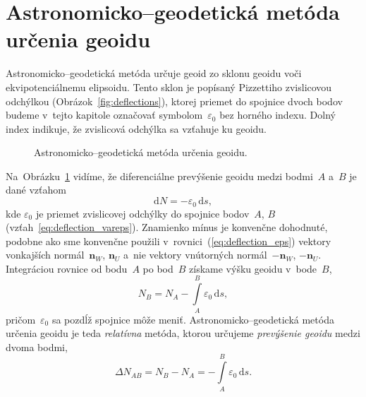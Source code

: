 \documentclass[a4paper, 12pt]{book}
\newcommand{\diff}{\mathrm d}
\let\vec\mathbf
\begin{document}
\section{Astronomicko--geodetická metóda určenia geoidu}
\label{sec:geoid_astrogeodetic}

Astronomicko--geodetická metóda určuje geoid zo sklonu geoidu voči 
ekvipotenciálnemu elipsoidu.  Tento sklon je popísaný Pizzettiho zvislicovou 
odchýlkou (Obrázok~\ref{fig:deflections}), ktorej priemet do spojnice dvoch 
bodov budeme v~tejto kapitole označovať symbolom~$\varepsilon_0$ bez horného 
indexu.  Dolný index indikuje, že zvislicová odchýlka sa vzťahuje ku geoidu.

\begin{figure}[bt]
\centering

\caption{Astronomicko--geodetická metóda určenia geoidu.}
\label{fig:astrogeodetic_method}
\end{figure}

Na~Obrázku~\ref{fig:astrogeodetic_method} vidíme, že diferenciálne prevýšenie 
geoidu medzi bodmi~$A$ a~$B$ je dané vzťahom \parencite{MoritzPhysicalGeodesy}
%
\begin{equation}
\label{eq:N_deflections}
\diff N = -\varepsilon_0 \, \diff s{,}
\end{equation}
%
kde $\varepsilon_0$ je priemet zvislicovej odchýlky do spojnice bodov~$A$, $B$ 
(vzťah~\ref{eq:deflection_vareps}).  Znamienko mínus je konvenčne dohodnuté, 
podobne ako sme konvenčne použili v~rovnici~(\ref{eq:deflection_eps}) vektory 
vonkajších normál~$\vec n_W$, $\vec n_U$ a~nie vektory vnútorných normál~$-\vec 
n_W$, $-\vec n_U$.  Integráciou rovnice od bodu~$A$ po bod~$B$ získame výšku 
geoidu v~bode~$B$,
%
\begin{equation}
\label{eq:N_deflections_nb}
N_B = N_A - \int\limits_A^B \varepsilon_0 \, \diff s{,}
\end{equation}
%
pričom~$\varepsilon_0$ sa pozdĺž spojnice môže meniť.  Astronomicko--geodetická 
metóda určenia geoidu je teda \emph{relatívna} metóda, ktorou určujeme 
\emph{prevýšenie geoidu} medzi dvoma bodmi,
%
\begin{equation}
\label{eq:N_deflections_delta}
\Delta N_{AB} = N_B - N_A = - \int\limits_A^B \varepsilon_0 \, \diff s{.}
\end{equation}
\end{document}
